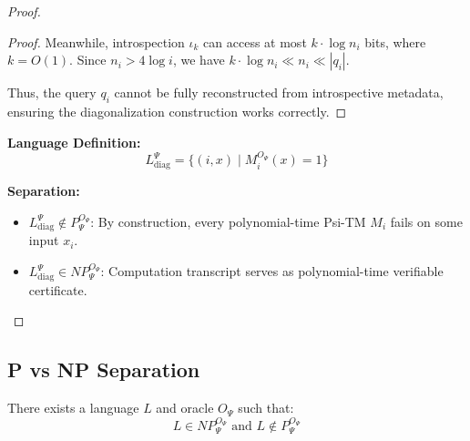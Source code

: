 \documentclass[11pt]{article}
\begin{document}
\begin{proof}
\begin{proof}
Meanwhile, introspection $\iota_k$ can access at most $k \cdot \log n_i$ bits, where $k = O(1)$. Since $n_i > 4\log i$, we have $k \cdot \log n_i \ll n_i \ll |q_i|$.

Thus, the query $q_i$ cannot be fully reconstructed from introspective metadata, ensuring the diagonalization construction works correctly.
\end{proof}

\textbf{Language Definition:}
$$L_{\text{diag}}^\Psi = \{(i, x) \mid M_i^{O_\Psi}(x) = 1\}$$

\textbf{Separation:}
\begin{itemize}
\item $L_{\text{diag}}^\Psi \notin P^{O_\Psi}_\Psi$: By construction, every polynomial-time Psi-TM $M_i$ fails on some input $x_i$.
\item $L_{\text{diag}}^\Psi \in NP^{O_\Psi}_\Psi$: Computation transcript serves as polynomial-time verifiable certificate.
\end{itemize}
\end{proof}

\subsection{P vs NP Separation}

\begin{theorem}
\label{thm:separation}
There exists a language $L$ and oracle $O_\Psi$ such that:
$$L \in NP^{O_\Psi}_\Psi \text{ and } L \notin P^{O_\Psi}_\Psi$$
\end{theorem}
\end{document}
